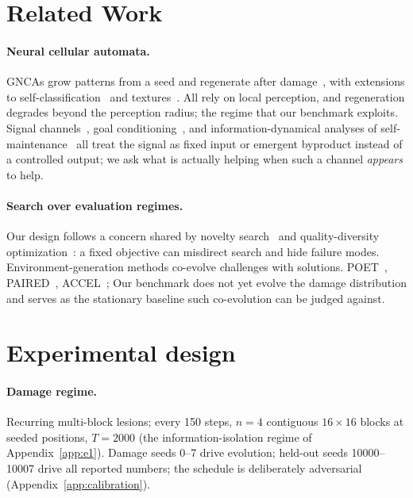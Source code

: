 \documentclass{article}
\begin{document}
\section{Related Work}
\label{sec:related}

\paragraph{Neural cellular automata.}
GNCAs grow patterns from a seed and regenerate after
damage~\cite{mordvintsev2020gnca}, with extensions to
self-classification~\cite{randazzo2020selfclass} and
textures~\cite{mordvintsev2021texture}. All rely on local perception, and
regeneration degrades beyond the perception radius; the regime that our
benchmark exploits. Signal channels~\cite{stovold2023signal}, goal
conditioning~\cite{sudhakaran2022goal}, and information-dynamical analyses
of self-maintenance~\cite{masumori2026fluctuations} all treat the signal
as fixed input or emergent byproduct instead of a controlled output; we ask
what is actually helping when such a channel \emph{appears} to help.

\paragraph{Search over evaluation regimes.}
Our design follows a concern shared by novelty
search~\cite{lehman2011novelty} and quality-diversity
optimization~\cite{mouret2015mapelites}: a fixed objective can misdirect
search and hide failure modes. Environment-generation methods co-evolve
challenges with solutions.
POET~\cite{wang2019poet}, PAIRED~\cite{dennis2020paired},
ACCEL~\cite{parkerholder2022accel}; Our benchmark does not yet evolve the
damage distribution and serves as the stationary baseline such
co-evolution can be judged against.

\section{Experimental design}
\label{sec:design}

\paragraph{Damage regime.}
Recurring multi-block lesions; every 150 steps, $n{=}4$ contiguous
$16{\times}16$ blocks at seeded positions, $T{=}2000$ (the
information-isolation regime of Appendix~\ref{app:e1}). Damage seeds 0--7 drive evolution; held-out
seeds 10000--10007 drive all reported numbers; the schedule is
deliberately adversarial (Appendix~\ref{app:calibration}).
\end{document}
